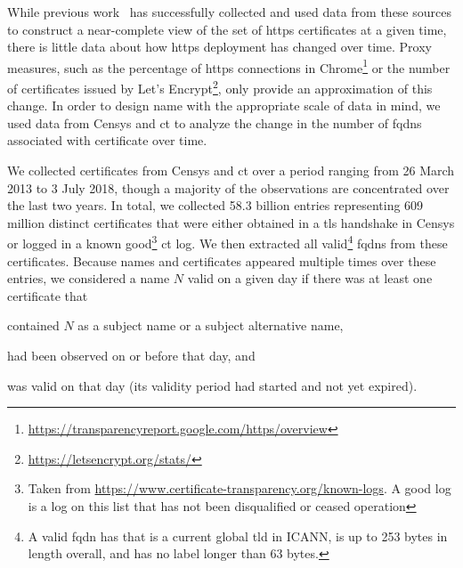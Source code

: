 While previous work~\cite{vandersloot2016towards, larisch2017crlite} has
successfully collected and used data from these sources to construct a
near-complete view of the set of \ac{https} certificates at a given time, there
is little data about how \ac{https} deployment has changed over time. Proxy
measures, such as the percentage of \ac{https} connections in
Chrome\footnote{\url{https://transparencyreport.google.com/https/overview}} or
the number of certificates issued by Let's
Encrypt\footnote{\url{https://letsencrypt.org/stats/}}, only provide an
approximation of this change. In order to design \ac{name} with the appropriate
scale of data in mind, we used data from Censys and \ac{ct} to analyze the
change in the number of \acp{fqdn} associated with  certificate over
time.

We collected certificates from Censys and \ac{ct} over a period ranging from 26
March 2013 to 3 July 2018, though a majority of the observations are
concentrated over the last two years. In total, we collected 58.3 billion
entries representing 609 million distinct certificates that were either obtained
in a \ac{tls} handshake in Censys or logged in a known good\footnote{Taken from
  \url{https://www.certificate-transparency.org/known-logs}. A good log is a log
  on this list that has not been disqualified or ceased operation} \ac{ct} log.
  We then extracted all valid\footnote{A valid \ac{fqdn} has  that is a
  current global \ac{tld} in ICANN, is up to 253 bytes in length overall, and
has no label longer than 63 bytes.} \acp{fqdn} from these certificates. Because
names and certificates appeared multiple times over these entries, we considered
a name $N$ valid on a given day if there was at least one certificate that
\begin{inparaenum}
\item contained $N$ as a subject name or a subject alternative name,
\item had been observed on or before that day, and
\item was valid on that day (its validity period had started and not yet
  expired).
\end{inparaenum}

